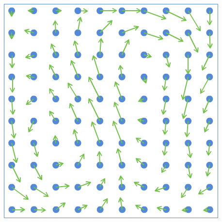 \documentclass{beamer}\usetheme{Madrid} %
\begin{document}
\begin{frame}[fragile]
\begin{columns}
\begin{center}
\includegraphics[scale=0.23]{img/particles_velocity.png}
\end{center}
\end{columns}
\end{frame}
\end{document}
